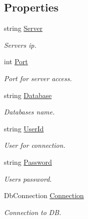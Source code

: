 \subsection*{Properties}
\begin{DoxyCompactItemize}
\item 
string \mbox{\hyperlink{interface_uniform_data_operator_1_1_sql_1_1_i_sql_operator_ab1b593e38cb9377dac847811c483f2f3}{Server}}
\begin{DoxyCompactList}\small\item\em Server\textquotesingle{}s ip. \end{DoxyCompactList}\item 
int \mbox{\hyperlink{interface_uniform_data_operator_1_1_sql_1_1_i_sql_operator_a2d0ac2538fa196b181f6e0ab523db137}{Port}}
\begin{DoxyCompactList}\small\item\em Port for server access. \end{DoxyCompactList}\item 
string \mbox{\hyperlink{interface_uniform_data_operator_1_1_sql_1_1_i_sql_operator_a55b7f28ed4ab20f124e67e2d447f8b40}{Database}}
\begin{DoxyCompactList}\small\item\em Database\textquotesingle{}s name. \end{DoxyCompactList}\item 
string \mbox{\hyperlink{interface_uniform_data_operator_1_1_sql_1_1_i_sql_operator_abf0c3a32c8161030b37ccf960c395d4f}{User\+Id}}
\begin{DoxyCompactList}\small\item\em User for connection. \end{DoxyCompactList}\item 
string \mbox{\hyperlink{interface_uniform_data_operator_1_1_sql_1_1_i_sql_operator_a90f63ab37347ec080b37dc3256ead7a4}{Password}}
\begin{DoxyCompactList}\small\item\em User\textquotesingle{}s password. \end{DoxyCompactList}\item 
Db\+Connection \mbox{\hyperlink{interface_uniform_data_operator_1_1_sql_1_1_i_sql_operator_a99f034a986828e96955e3187cdfb28da}{Connection}}
\begin{DoxyCompactList}\small\item\em Connection to DB. \end{DoxyCompactList}\end{DoxyCompactItemize}



